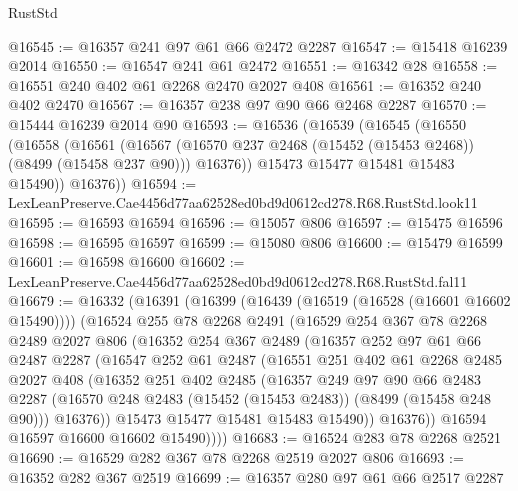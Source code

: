 \begin{lexlean}{RustStd}
\begin{coremodule}
@16545 := @16357 @241 @97 @61 @66 @2472 @2287
@16547 := @15418 @16239 @2014
@16550 := @16547 @241 @61 @2472
@16551 := @16342 @28
@16558 := @16551 @240 @402 @61 @2268 @2470 @2027 @408
@16561 := @16352 @240 @402 @2470
@16567 := @16357 @238 @97 @90 @66 @2468 @2287
@16570 := @15444 @16239 @2014 @90
@16593 := @16536
    (@16539
      (@16545
        (@16550
          (@16558
            (@16561
              (@16567 (@16570 @237 @2468 (@15452 (@15453 @2468)) (@8499 (@15458 @237 @90))) @16376))
            @15473
            @15477
            @15481
            @15483
            @15490))
        @16376))
@16594 := LexLeanPreserve.Cae4456d77aa62528ed0bd9d0612cd278.R68.RustStd.look11
@16595 := @16593 @16594
@16596 := @15057 @806
@16597 := @15475 @16596
@16598 := @16595 @16597
@16599 := @15080 @806
@16600 := @15479 @16599
@16601 := @16598 @16600
@16602 := LexLeanPreserve.Cae4456d77aa62528ed0bd9d0612cd278.R68.RustStd.fal11
@16679 := @16332
    (@16391
      (@16399
        (@16439 (@16519 (@16528 (@16601 @16602 @15490))))
        (@16524
          @255
          @78
          @2268
          @2491
          (@16529
            @254
            @367
            @78
            @2268
            @2489
            @2027
            @806
            (@16352
              @254
              @367
              @2489
              (@16357
                @252
                @97
                @61
                @66
                @2487
                @2287
                (@16547
                  @252
                  @61
                  @2487
                  (@16551
                    @251
                    @402
                    @61
                    @2268
                    @2485
                    @2027
                    @408
                    (@16352
                      @251
                      @402
                      @2485
                      (@16357
                        @249
                        @97
                        @90
                        @66
                        @2483
                        @2287
                        (@16570 @248 @2483 (@15452 (@15453 @2483)) (@8499 (@15458 @248 @90)))
                        @16376))
                    @15473
                    @15477
                    @15481
                    @15483
                    @15490))
                @16376))
            @16594
            @16597
            @16600
            @16602
            @15490))))
@16683 := @16524 @283 @78 @2268 @2521
@16690 := @16529 @282 @367 @78 @2268 @2519 @2027 @806
@16693 := @16352 @282 @367 @2519
@16699 := @16357 @280 @97 @61 @66 @2517 @2287

\end{coremodule}
\end{lexlean}
